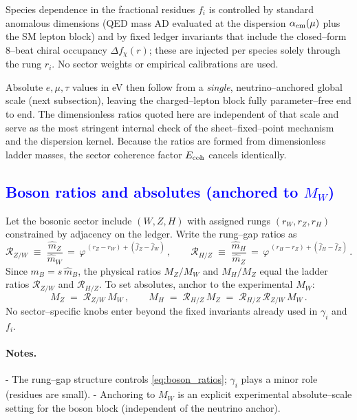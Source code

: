 \documentclass[%
 amsmath,amssymb,
 aps,
prb,
floatfix, showkeys
]{revtex4-2}
\newcommand{\modif}[1]{\textcolor{blue}{#1}}
\begin{document}
Species dependence in the fractional residues $f_i$ is controlled by standard anomalous dimensions (QED mass AD evaluated at the dispersion $\alpha_{\rm em}(\mu)$ plus the SM lepton block) and by fixed ledger invariants that include the closed–form 8–beat chiral occupancy $\Delta f_\chi(r)$; these are injected per species solely through the rung $r_i$. No sector weights or empirical calibrations are used.

Absolute $e,\mu,\tau$ values in eV then follow from a \emph{single}, neutrino–anchored global scale (next subsection), leaving the charged–lepton block fully parameter–free end to end.
 The dimensionless ratios quoted here are independent of that scale and serve as the most stringent internal check of the sheet–fixed–point mechanism and the dispersion kernel.
Because the ratios are formed from dimensionless ladder masses, the sector coherence factor $E_{\rm coh}$ cancels identically.








{\modif{
\subsection{Boson ratios and absolutes (anchored to $M_W$)}
\label{subsec:bosons}
}}
Let the bosonic sector include $(W,Z,H)$ with assigned rungs $(r_W,r_Z,r_H)$ constrained by adjacency on the ledger.
Write the rung--gap ratios as
\begin{equation}
  \mathcal{R}_{Z/W} \;\equiv\; \frac{\widehat m_Z}{\widehat m_W}
  \,=\, \varphi^{\,(r_Z-r_W) + (\widehat f_Z - \widehat f_W)}\,,\qquad
  \mathcal{R}_{H/Z} \;\equiv\; \frac{\widehat m_H}{\widehat m_Z}
  \,=\, \varphi^{\,(r_H-r_Z) + (\widehat f_H - \widehat f_Z)}\,.
  \label{eq:boson_ratios}
\end{equation}
Since $m_B=s\,\widehat m_B$, the physical ratios $M_Z/M_W$ and $M_H/M_Z$ equal the ladder ratios $\mathcal{R}_{Z/W}$ and $\mathcal{R}_{H/Z}$.
To set absolutes, anchor to the experimental $M_W$:
\begin{equation}
  M_Z \;=\; \mathcal{R}_{Z/W}\,M_W\,,\qquad
  M_H \;=\; \mathcal{R}_{H/Z}\,M_Z \;=\; \mathcal{R}_{H/Z}\,\mathcal{R}_{Z/W}\,M_W\,.
  \label{eq:boson_absolutes}
\end{equation}
No sector--specific knobs enter beyond the fixed invariants already used in $\gamma_i$ and $f_i$.

\paragraph{Notes.}
- The rung--gap structure controls \eqref{eq:boson_ratios}; $\gamma_i$ plays a minor role (residues are small).
- Anchoring to $M_W$ is an explicit experimental absolute--scale setting for the boson block (independent of the neutrino anchor).
\end{document}
